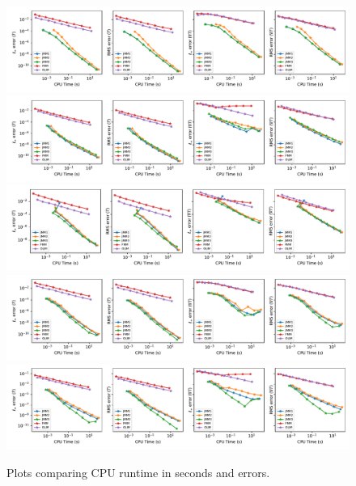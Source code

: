\documentclass{siamart190516}
\begin{document}
\begin{figure}
  \includegraphics[width=\textwidth]{plots/time_vs_errors_1.pdf}
  \includegraphics[width=\textwidth]{plots/time_vs_errors_g.pdf}
  \includegraphics[width=\textwidth]{plots/time_vs_errors_m.pdf}
  \includegraphics[width=\textwidth]{plots/time_vs_errors_p.pdf}
  \includegraphics[width=\textwidth]{plots/time_vs_errors_v.pdf}
  \caption{Plots comparing CPU runtime in seconds and
    errors.}\label{fig:time-vs-error}
\end{figure}
\end{document}
